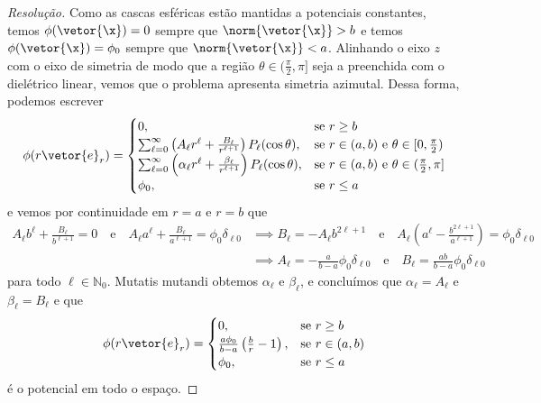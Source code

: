 \begin{proof}[Resolução]
    Como as cascas esféricas estão mantidas a potenciais constantes, temos \(\phi(\vetor{\x}) = 0\) sempre que \(\norm{\vetor{\x}} > b\) e temos \(\phi(\vetor{\x}) = \phi_0\) sempre que \(\norm{\vetor{\x}} < a\). Alinhando o eixo \(z\) com o eixo de simetria de modo que a região \(\theta \in (\frac{\pi}{2}, \pi]\) seja a preenchida com o dielétrico linear, vemos que o problema apresenta simetria azimutal. Dessa forma, podemos escrever
    \begin{equation*}
        \phi(r \vetor{e}_r) = \begin{cases}
            0,&\text{se }r \geq b\\
            \sum_{\ell = 0}^\infty \left(A_\ell r^\ell + \frac{B_\ell}{r^{\ell + 1}}\right)P_\ell(\cos\theta),&\text{se }r \in (a,b)\text{ e }\theta \in [0, \frac{\pi}{2})\\
            \sum_{\ell = 0}^\infty \left(\alpha_\ell r^\ell + \frac{\beta_\ell}{r^{\ell + 1}}\right)P_\ell(\cos\theta),&\text{se }r \in (a,b)\text{ e }\theta \in (\frac{\pi}{2},\pi]\\
            \phi_0,&\text{se }r \leq a
        \end{cases}
    \end{equation*}
    e vemos por continuidade em \(r = a\) e \(r = b\) que
    \begin{align*}
        A_\ell b^\ell + \frac{B_\ell}{b^{\ell + 1}} = 0 \quad\text{e}\quad A_\ell a^\ell + \frac{B_\ell}{a^{\ell + 1}} = \phi_0 \delta_{\ell 0}
        &\implies B_\ell = -A_\ell b^{2\ell + 1} \quad\text{e}\quad A_\ell\left(a^\ell - \frac{b^{2\ell + 1}}{a^{\ell + 1}}\right) = \phi_0 \delta_{\ell 0}\\
        &\implies A_\ell = -\frac{a}{b - a} \phi_0 \delta_{\ell 0} \quad\text{e}\quad B_\ell = \frac{ab}{b - a} \phi_0 \delta_{\ell 0}
    \end{align*}
    para todo \(\ell \in \mathbb{N}_0\). Mutatis mutandi obtemos \(\alpha_\ell\) e \(\beta_\ell\), e concluímos que \(\alpha_\ell = A_\ell\) e \(\beta_\ell = B_\ell\)
    e que
    \begin{equation*}
        \phi(r \vetor{e}_r) = \begin{cases}
            0,&\text{se }r \geq b\\
            \frac{a\phi_0}{b - a}\left(\frac{b}{r} - 1\right),&\text{se }r \in (a,b)\\
            \phi_0,&\text{se }r \leq a
        \end{cases}
    \end{equation*}
    é o potencial em todo o espaço.
\end{proof}

